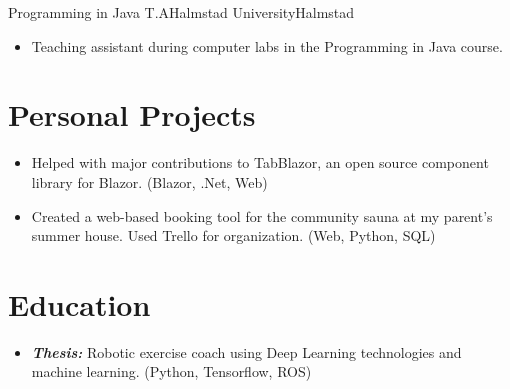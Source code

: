 \documentclass[11pt,a4paper,sans,colorlinks,linkcolor=blue,urlcolor=blue]{moderncv}
\begin{document}
{Programming in Java T.A}{Halmstad University}{Halmstad}{}
{\begin{itemize}
    \itemsep0.3em
    \setlength{\itemindent}{.25in}
    \item Teaching assistant during computer labs in the Programming in Java course.
\end{itemize}}


\section{Personal Projects}
{\begin{itemize}
    \itemsep0.3em
    \setlength{\itemindent}{.25in}
    \item Helped with major contributions to TabBlazor, an open source component library for Blazor. (Blazor, .Net, Web)
\end{itemize}}

{\begin{itemize}
    \itemsep0.3em
    \setlength{\itemindent}{.25in}
    \item Created a web-based booking tool for the community sauna at my parent's summer house. Used Trello for organization. (Web, Python, SQL)
\end{itemize}}

\section{Education}
{\begin{itemize}
    \setlength{\itemindent}{.25in}
    \itemsep0.3em
    \item \textit{\textbf{Thesis:}} Robotic exercise coach using Deep Learning technologies and machine learning. (Python, Tensorflow, ROS)
\end{itemize}}


\end{document}
